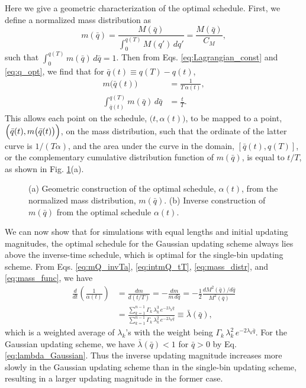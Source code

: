 \documentclass[reprint, superscriptaddress, floatfix]{revtex4-1}
\begin{document}
Here we give a geometric characterization
of the optimal schedule.
%
First, we define a normalized mass distribution as
%
\begin{equation}
  m(\bar q)
  =
  \frac{
    M(\bar q)
  }
  {
    \int_0^{ q(T) } M(q') \, d q'
  }
  =
  \frac{
    M(\bar q)
  }
  {
    C_M
  }
  ,
  \label{eq:mass_distr}
\end{equation}
%
such that
$\int_0^{q(T)} m(\bar q) \, d\bar q = 1$.
%
Then from Eqs. \eqref{eq:Lagrangian_const} and \eqref{eq:q_opt},
we find that for $\bar q(t) \equiv q(T) - q(t)$,
%
\begin{align}
  m\bigl( \bar q(t) \bigr)
  &=
  \frac{ 1 }
       { T \, \alpha(t) }
  ,
  \label{eq:mQ_invTa}
  \\
  \int_{\bar q(t)}^{ q(T) }
    m(\bar q) \, d \bar q
  &=
  \frac t T
  .
  \label{eq:intmQ_tT}
\end{align}
%
This allows each point on the schedule,
$\bigl(t, \alpha(t)\bigr)$,
to be mapped to a point,
$\Bigl(\bar q(t), m\bigl(\bar q(t)\bigr)\Bigr)$,
on the mass distribution,
such that the ordinate of the latter curve
is $1/(T\alpha)$,
and the area under the curve in the domain, $[\bar q(t), q(T)]$,
or the complementary cumulative distribution function of $m(\bar q)$,
is equal to $t/T$,
as shown in Fig. \ref{fig:massq}(a).

\begin{figure}[h]\centering
  \caption{
    \label{fig:massq}
    (a) Geometric construction of the optimal schedule,
    $\alpha(t)$,
    from the normalized mass distribution,
    $m(\bar q)$.
    (b) Inverse construction of $m(\bar q)$
    from the optimal schedule $\alpha(t)$.
  }
\end{figure}

We can now show that
for simulations with equal lengths and initial updating magnitudes,
the optimal schedule for the Gaussian updating scheme
always lies above the inverse-time schedule,
which is optimal for the single-bin updating scheme.
%
From Eqs. \eqref{eq:mQ_invTa}, \eqref{eq:intmQ_tT},
\eqref{eq:mass_distr}, and \eqref{eq:mass_func},
we have
%
\begin{align*}
  \frac{d}{dt}\left(\frac{1}{\alpha(t)}\right)
  &=
  \frac{ dm } { d(t/T) }
  =
  -\frac{dm}{m\,d\bar q}
  =
  -\frac{1}{2} \frac{ dM^2(\bar q)/d\bar q }
  { M^2(\bar q) }
  \\
  &
  =
  \frac{ \sum_{k=1}^{n-1} \Gamma_k \, \lambda_k^3 \, e^{-2\lambda_k \bar q} }
  { \sum_{k=1}^{n-1} \Gamma_k \, \lambda_k^2 \, e^{-2\lambda_k \bar q} }
  \equiv
  \bar\lambda(\bar q)
  ,
\end{align*}
%
which is a weighted average of $\lambda_k$'s
with the weight being $\Gamma_k \, \lambda_k^2 \, e^{-2\lambda_k \bar q}$.
%
For the Gaussian updating scheme,
we have $\bar \lambda(\bar q) < 1$ for $\bar q > 0$
by Eq. \eqref{eq:lambda_Gaussian}.
%
Thus the inverse updating magnitude
increases more slowly
in the Gaussian updating scheme
than in the single-bin updating scheme,
resulting in a larger updating magnitude
in the former case.
\end{document}
